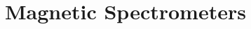 \part{Magnetic Spectrometers}
\graphicspath{{hrs/figs/}}
\renewcommand{\dirfig}[0]{hrs/figs}
\renewcommand{\dircur}[0]{hrs}


\newpage

\newpage

\newpage

\newpage


%
%
%
%
%
